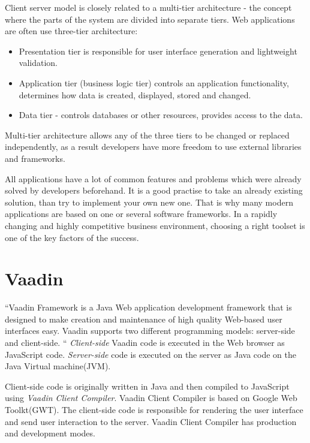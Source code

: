     	Client server model is closely related to a multi-tier architecture - the
    	concept where the parts of the system are divided into separate tiers. Web applications
    	 are often use three-tier architecture:
    	 \begin{itemize}
    	   \item Presentation tier is responsible for user interface generation and
    	   lightweight validation.
    	   \item Application tier (business logic tier) controls an application
    	   functionality, determines how data is created, displayed, stored and
    	   changed.
    	   \item Data tier - controls databases or other resources, provides access
    	   to the data.
    	 \end{itemize}
    	Multi-tier architecture allows any of the three tiers to be changed or
    	replaced independently, as a result developers have more freedom to use
    	external libraries and frameworks.
		
		All	applications have a lot of common features and problems which were already
		solved by developers beforehand. It is a good practise to take an already
		existing solution, than try to implement your own new one. That is why many
		modern applications are based on one or several software frameworks. In a
		rapidly changing and highly competitive business environment, choosing a right toolset is one of
		the key factors of the success.	 	
		
  \section{Vaadin}
  \label{ch:vaadin}
   ``Vaadin Framework is a Java Web application development framework that is
  designed to make creation and maintenance of high quality Web-based user interfaces easy.
   Vaadin supports two different programming models: server-side and client-side. 
   `` \cite[pr1.1]{bookVaaidn}
   \emph{Client-side} Vaadin code is executed in the Web browser as JavaScript
   code.
   \emph{Server-side} code is executed on the server as Java code on the Java
   Virtual machine(JVM).

   Client-side code is originally written in Java and then
   compiled to JavaScript using \emph{Vaadin Client Compiler}. Vaadin Client Compiler is based on Google
   Web Toolkt(GWT). The client-side code is responsible for rendering
   the user interface and send user interaction to the server. Vaadin Client
   Compiler has production and development modes. 
   
